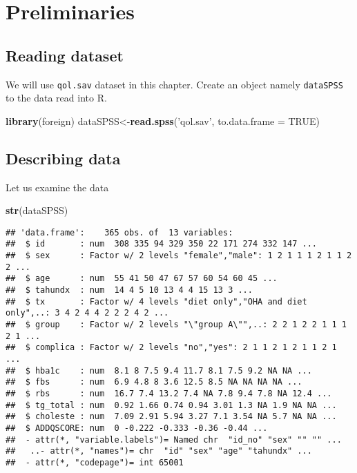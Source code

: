 \documentclass[]{book}
\newenvironment{Shaded}{\begin{snugshade}}{\end{snugshade}}
\newcommand{\KeywordTok}[1]{\textcolor[rgb]{0.13,0.29,0.53}{\textbf{{#1}}}}
\newcommand{\DataTypeTok}[1]{\textcolor[rgb]{0.13,0.29,0.53}{{#1}}}
\newcommand{\StringTok}[1]{\textcolor[rgb]{0.31,0.60,0.02}{{#1}}}
\newcommand{\OtherTok}[1]{\textcolor[rgb]{0.56,0.35,0.01}{{#1}}}
\newcommand{\NormalTok}[1]{{#1}}
\theoremstyle{definition}
\theoremstyle{definition}
\theoremstyle{remark}
\begin{document}
\section{Preliminaries}\label{preliminaries}

\subsection{Reading dataset}\label{reading-dataset}

We will use \texttt{qol.sav} dataset in this chapter. Create an object
namely \texttt{dataSPSS} to the data read into R.

\begin{Shaded}
\begin{Highlighting}[]
\KeywordTok{library}\NormalTok{(foreign)}
\NormalTok{dataSPSS<-}\KeywordTok{read.spss}\NormalTok{(}\StringTok{'qol.sav'}\NormalTok{, }\DataTypeTok{to.data.frame =} \OtherTok{TRUE}\NormalTok{)}
\end{Highlighting}
\end{Shaded}

\subsection{Describing data}\label{describing-data}

Let us examine the data

\begin{Shaded}
\begin{Highlighting}[]
\KeywordTok{str}\NormalTok{(dataSPSS)}
\end{Highlighting}
\end{Shaded}

\begin{verbatim}
## 'data.frame':    365 obs. of  13 variables:
##  $ id       : num  308 335 94 329 350 22 171 274 332 147 ...
##  $ sex      : Factor w/ 2 levels "female","male": 1 2 1 1 1 2 1 1 2 2 ...
##  $ age      : num  55 41 50 47 67 57 60 54 60 45 ...
##  $ tahundx  : num  14 4 5 10 13 4 4 15 13 3 ...
##  $ tx       : Factor w/ 4 levels "diet only","OHA and diet only",..: 3 4 2 4 4 2 2 2 4 2 ...
##  $ group    : Factor w/ 2 levels "\"group A\"",..: 2 2 1 2 2 1 1 1 2 1 ...
##  $ complica : Factor w/ 2 levels "no","yes": 2 1 1 2 1 2 1 1 2 1 ...
##  $ hba1c    : num  8.1 8 7.5 9.4 11.7 8.1 7.5 9.2 NA NA ...
##  $ fbs      : num  6.9 4.8 8 3.6 12.5 8.5 NA NA NA NA ...
##  $ rbs      : num  16.7 7.4 13.2 7.4 NA 7.8 9.4 7.8 NA 12.4 ...
##  $ tg_total : num  0.92 1.66 0.74 0.94 3.01 1.3 NA 1.9 NA NA ...
##  $ choleste : num  7.09 2.91 5.94 3.27 7.1 3.54 NA 5.7 NA NA ...
##  $ ADDQSCORE: num  0 -0.222 -0.333 -0.36 -0.44 ...
##  - attr(*, "variable.labels")= Named chr  "id_no" "sex" "" "" ...
##   ..- attr(*, "names")= chr  "id" "sex" "age" "tahundx" ...
##  - attr(*, "codepage")= int 65001
\end{verbatim}
\end{document}
